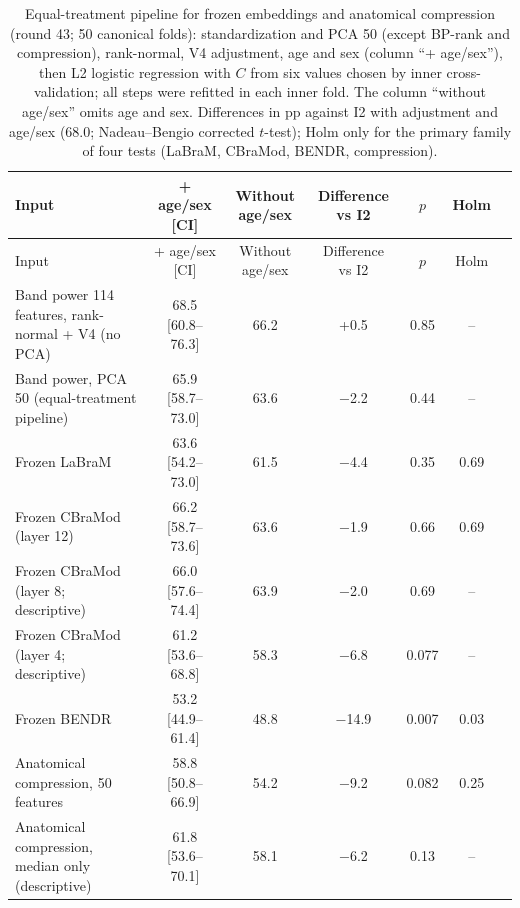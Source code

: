 {\scriptsize
\setlength{\tabcolsep}{3pt}
\begin{longtable}{p{}cccccc}
\caption{Equal-treatment pipeline for frozen embeddings and anatomical compression (round 43; 50 canonical folds): standardization and PCA 50 (except BP-rank and compression), rank-normal, V4 adjustment, age and sex (column ``+ age/sex''), then L2 logistic regression with $C$ from six values chosen by inner cross-validation; all steps were refitted in each inner fold. The column ``without age/sex'' omits age and sex. Differences in pp against I2 with adjustment and age/sex (68.0; Nadeau--Bengio corrected $t$-test); Holm only for the primary family of four tests (LaBraM, CBraMod, BENDR, compression).}\label{tab:setara43}\\
\toprule
Input & + age/sex [CI] & Without age/sex & Difference vs I2 & $p$ & Holm \\
\midrule
\endfirsthead
\toprule
Input & + age/sex [CI] & Without age/sex & Difference vs I2 & $p$ & Holm \\
\midrule
\endhead
\bottomrule
\endfoot
Band power 114 features, rank-normal + V4 (no PCA) & 68.5 [60.8--76.3] & 66.2 & +0.5 & 0.85 & -- \\
Band power, PCA 50 (equal-treatment pipeline) & 65.9 [58.7--73.0] & 63.6 & $-$2.2 & 0.44 & -- \\
Frozen LaBraM & 63.6 [54.2--73.0] & 61.5 & $-$4.4 & 0.35 & 0.69 \\
Frozen CBraMod (layer 12) & 66.2 [58.7--73.6] & 63.6 & $-$1.9 & 0.66 & 0.69 \\
Frozen CBraMod (layer 8; descriptive) & 66.0 [57.6--74.4] & 63.9 & $-$2.0 & 0.69 & -- \\
Frozen CBraMod (layer 4; descriptive) & 61.2 [53.6--68.8] & 58.3 & $-$6.8 & 0.077 & -- \\
Frozen BENDR & 53.2 [44.9--61.4] & 48.8 & $-$14.9 & 0.007 & 0.03 \\
Anatomical compression, 50 features & 58.8 [50.8--66.9] & 54.2 & $-$9.2 & 0.082 & 0.25 \\
Anatomical compression, median only (descriptive) & 61.8 [53.6--70.1] & 58.1 & $-$6.2 & 0.13 & -- \\
\end{longtable}
}
